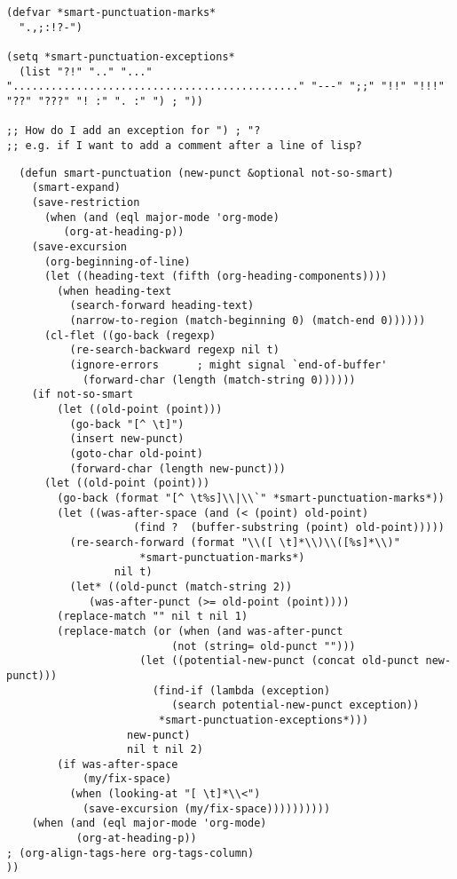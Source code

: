 \documentclass[11pt]{article}
\begin{document}
\begin{verbatim}
(defvar *smart-punctuation-marks*
  ".,;:!?-")

(setq *smart-punctuation-exceptions*
  (list "?!" ".." "..." "............................................." "---" ";;" "!!" "!!!" "??" "???" "! :" ". :" ") ; "))

;; How do I add an exception for ") ; "?
;; e.g. if I want to add a comment after a line of lisp?

\end{verbatim}

\label{sec:orga5fad1e}

\begin{verbatim}
  (defun smart-punctuation (new-punct &optional not-so-smart)
    (smart-expand)
    (save-restriction
      (when (and (eql major-mode 'org-mode)
		 (org-at-heading-p))
	(save-excursion
	  (org-beginning-of-line)
	  (let ((heading-text (fifth (org-heading-components))))
	    (when heading-text
	      (search-forward heading-text)
	      (narrow-to-region (match-beginning 0) (match-end 0))))))
      (cl-flet ((go-back (regexp)
		  (re-search-backward regexp nil t)
		  (ignore-errors      ; might signal `end-of-buffer'
		    (forward-char (length (match-string 0))))))
	(if not-so-smart
	    (let ((old-point (point)))
	      (go-back "[^ \t]")
	      (insert new-punct)
	      (goto-char old-point)
	      (forward-char (length new-punct)))
	  (let ((old-point (point)))
	    (go-back (format "[^ \t%s]\\|\\`" *smart-punctuation-marks*))
	    (let ((was-after-space (and (< (point) old-point)
					(find ?  (buffer-substring (point) old-point)))))
	      (re-search-forward (format "\\([ \t]*\\)\\([%s]*\\)"
					 *smart-punctuation-marks*)
				 nil t)
	      (let* ((old-punct (match-string 2))
		     (was-after-punct (>= old-point (point))))
		(replace-match "" nil t nil 1)
		(replace-match (or (when (and was-after-punct
					      (not (string= old-punct "")))
				     (let ((potential-new-punct (concat old-punct new-punct)))
				       (find-if (lambda (exception)
						  (search potential-new-punct exception))
						*smart-punctuation-exceptions*)))
				   new-punct)
			       nil t nil 2)
		(if was-after-space
		    (my/fix-space)
		  (when (looking-at "[ \t]*\\<")
		    (save-excursion (my/fix-space))))))))))
    (when (and (eql major-mode 'org-mode)
	       (org-at-heading-p))
; (org-align-tags-here org-tags-column)
))
\end{verbatim}
\end{document}
